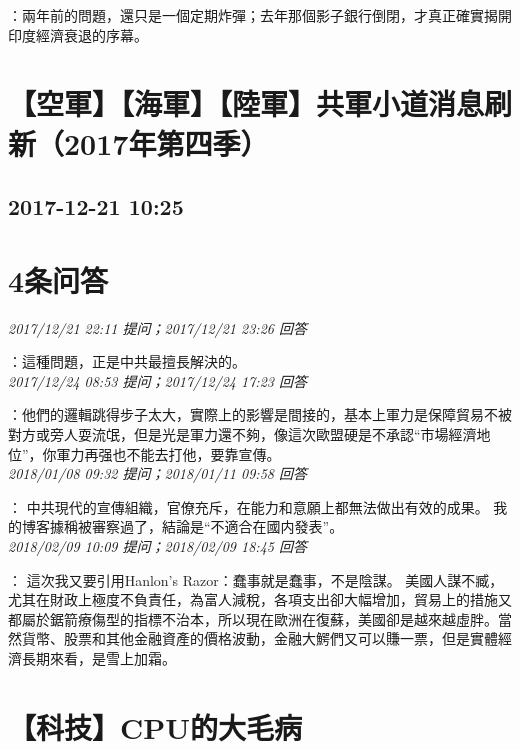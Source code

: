 \documentclass[twocolumn]{ctexart}
\begin{document}
：兩年前的問題，還只是一個定期炸彈；去年那個影子銀行倒閉，才真正確實揭開印度經濟衰退的序幕。
\\


\section{【空軍】【海軍】【陸軍】共軍小道消息刷新（2017年第四季）}
\subsection{2017-12-21 10:25}


\section{4条问答}

\textit{\hfill\noindent\small 2017/12/21 22:11 提问；2017/12/21 23:26 回答}

：這種問題，正是中共最擅長解決的。
\\

\textit{\hfill\noindent\small 2017/12/24 08:53 提问；2017/12/24 17:23 回答}

：他們的邏輯跳得步子太大，實際上的影響是間接的，基本上軍力是保障貿易不被對方或旁人耍流氓，但是光是軍力還不夠，像這次歐盟硬是不承認“市場經濟地位”，你軍力再强也不能去打他，要靠宣傳。
\\

\textit{\hfill\noindent\small 2018/01/08 09:32 提问；2018/01/11 09:58 回答}

：
中共現代的宣傳組織，官僚充斥，在能力和意願上都無法做出有效的成果。
我的博客據稱被審察過了，結論是“不適合在國内發表”。
\\

\textit{\hfill\noindent\small 2018/02/09 10:09 提问；2018/02/09 18:45 回答}

：
這次我又要引用Hanlon's Razor：蠢事就是蠢事，不是陰謀。
美國人謀不臧，尤其在財政上極度不負責任，為富人減稅，各項支出卻大幅增加，貿易上的措施又都屬於鋸箭療傷型的指標不治本，所以現在歐洲在復蘇，美國卻是越來越虛胖。當然貨幣、股票和其他金融資產的價格波動，金融大鰐們又可以賺一票，但是實體經濟長期來看，是雪上加霜。
\\


\section{【科技】CPU的大毛病}
\end{document}
